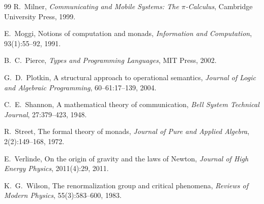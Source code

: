 \documentclass[12pt,a4paper]{article}
\theoremstyle{definition}
\theoremstyle{remark}
\begin{document}
\begin{thebibliography}{99}
R.~Milner, \emph{Communicating and Mobile Systems: The $\pi$-Calculus},
Cambridge University Press, 1999.

E.~Moggi, Notions of computation and monads,
\emph{Information and Computation}, 93(1):55--92, 1991.

B.~C.~Pierce, \emph{Types and Programming Languages}, MIT Press, 2002.

G.~D.~Plotkin, A structural approach to operational semantics,
\emph{Journal of Logic and Algebraic Programming}, 60--61:17--139, 2004.

C.~E.~Shannon, A mathematical theory of communication,
\emph{Bell System Technical Journal}, 27:379--423, 1948.

R.~Street, The formal theory of monads,
\emph{Journal of Pure and Applied Algebra}, 2(2):149--168, 1972.

E.~Verlinde, On the origin of gravity and the laws of Newton,
\emph{Journal of High Energy Physics}, 2011(4):29, 2011.

K.~G.~Wilson, The renormalization group and critical phenomena,
\emph{Reviews of Modern Physics}, 55(3):583--600, 1983.

\end{thebibliography}
\end{document}
